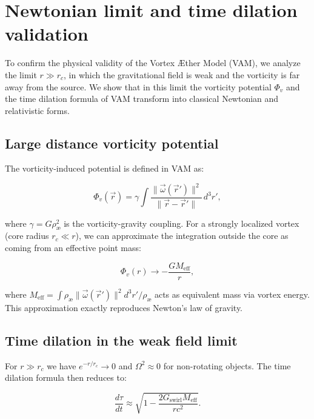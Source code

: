 \section{Newtonian limit and time dilation validation}

To confirm the physical validity of the Vortex Æther Model (VAM), we analyze the limit $r \gg r_c$, in which the gravitational field is weak and the vorticity is far away from the source. We show that in this limit the vorticity potential $\Phi_v$ and the time dilation formula of VAM transform into classical Newtonian and relativistic forms.

\subsection{Large distance vorticity potential}

The vorticity-induced potential is defined in VAM as:

\begin{equation}
    \Phi_v(\vec{r}) = \gamma \int \frac{\|\vec{\omega}(\vec{r}')\|^2}{\|\vec{r} - \vec{r}'\|} \, d^3r',
\end{equation}

where $\gamma = G \rho_\text{æ}^2$ is the vorticity-gravity coupling. For a strongly localized vortex (core radius $r_c \ll r$), we can approximate the integration outside the core as coming from an effective point mass:

\begin{equation}
    \Phi_v(r) \to -\frac{G M_{\text{eff}}}{r},
\end{equation}

where $M_{\text{eff}} = \int \rho_\text{æ} \|\vec{\omega}(\vec{r}')\|^2 d^3r' / \rho_\text{æ}$ acts as equivalent mass via vortex energy. This approximation exactly reproduces Newton's law of gravity.

\subsection{Time dilation in the weak field limit}

For $r \gg r_c$ we have $e^{-r/r_c} \to 0$ and $\Omega^2 \approx 0$ for non-rotating objects. The time dilation formula then reduces to:

\begin{equation}
    \frac{d\tau}{dt} \approx \sqrt{1 - \frac{2 G_{\text{swirl}} M_{\text{eff}}}{r c^2}}.
\end{equation}

